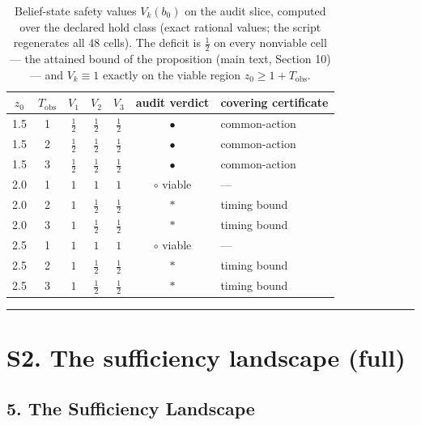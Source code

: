 \documentclass[11pt]{article}
\theoremstyle{definition}
\begin{document}
\begin{table}[t]
\centering
\footnotesize
\begin{tabular}{@{}cc|ccc|c|l@{}}
\toprule
\(z_{0}\) & \(T_{\mathrm{obs}}\) & \(V_{1}\) & \(V_{2}\) & \(V_{3}\) & audit verdict & covering certificate \\
\midrule
1.5 & 1 & \(\tfrac{1}{2}\) & \(\tfrac{1}{2}\) & \(\tfrac{1}{2}\) & \(\bullet\) & common-action \\
1.5 & 2 & \(\tfrac{1}{2}\) & \(\tfrac{1}{2}\) & \(\tfrac{1}{2}\) & \(\bullet\) & common-action \\
1.5 & 3 & \(\tfrac{1}{2}\) & \(\tfrac{1}{2}\) & \(\tfrac{1}{2}\) & \(\bullet\) & common-action \\
2.0 & 1 & \(1\) & \(1\) & \(1\) & \(\circ\) viable & --- \\
2.0 & 2 & \(1\) & \(\tfrac{1}{2}\) & \(\tfrac{1}{2}\) & \(\ast\) & timing bound \\
2.0 & 3 & \(1\) & \(\tfrac{1}{2}\) & \(\tfrac{1}{2}\) & \(\ast\) & timing bound \\
2.5 & 1 & \(1\) & \(1\) & \(1\) & \(\circ\) viable & --- \\
2.5 & 2 & \(1\) & \(\tfrac{1}{2}\) & \(\tfrac{1}{2}\) & \(\ast\) & timing bound \\
2.5 & 3 & \(1\) & \(\tfrac{1}{2}\) & \(\tfrac{1}{2}\) & \(\ast\) & timing bound \\
\bottomrule
\end{tabular}
\caption{Belief-state safety values \(V_{k}(b_{0})\) on the audit slice,
computed over the declared hold class (exact rational values; the script
regenerates all 48 cells). The deficit is \(\tfrac{1}{2}\) on every nonviable
cell --- the attained bound of the proposition (main text, Section 10) --- and
\(V_{k} \equiv 1\) exactly on the viable region \(z_{0} \ge 1 + T_{\mathrm{obs}}\).}
\label{tab:beliefV}
\end{table}
\rule{0.5\linewidth}{0.5pt}

\bigskip

\section*{S2. The sufficiency landscape (full)}

\subsection{5. The Sufficiency Landscape}\label{the-sufficiency-landscape-cited}
\end{document}
